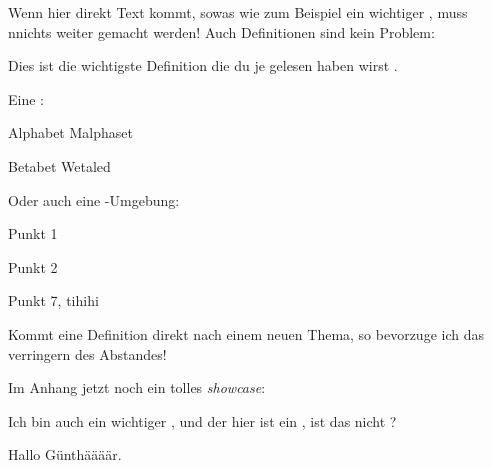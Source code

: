 \documentclass[Zusammenfassung, Vorlesung=ANA1, Semester=2]{Lilly}
\begin{document}
Wenn hier direkt Text kommt, sowas wie zum Beispiel ein wichtiger , muss nnichts weiter gemacht werden!
Auch Definitionen sind kein Problem:
\begin{definition}[Wichtig]
    Dies ist die wichtigste Definition die du je gelesen haben wirst .
\end{definition}
Eine :
\begin{smalldesc}
    \item[Alphabet] Malphaset
    \item[Betabet] Wetaled
\end{smalldesc}
Oder auch eine -Umgebung:
\begin{smalldite}
    \item Punkt 1
    \item Punkt 2
    \item Punkt 7, tihihi
\end{smalldite}
\TOPskip
\begin{definition}[Heyho]
    Kommt eine Definition direkt nach einem neuen Thema, so bevorzuge ich das verringern des Abstandes!
\end{definition}

\startAppendix

Im Anhang jetzt noch ein tolles \emph{showcase}:
\begin{center}
\end{center}
Ich bin auch ein wichtiger , und der hier ist ein , ist das nicht ?

\begin{definition}[Anhangsdefinition]
Hallo Günthäääär.
\end{definition}
\end{document}
